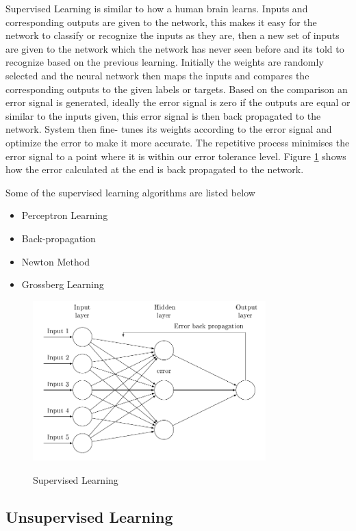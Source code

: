 \documentclass[12pt, a4paper]{report}
\begin{document}
Supervised Learning is similar to how a human brain learns. Inputs and corresponding outputs are given to the network, this makes it easy for the network to classify or recognize the inputs as they are, then a new set of inputs are given to the network which the network has never seen before and its told to recognize based on the previous learning. Initially the weights are randomly selected and the neural network then maps the inputs and compares the corresponding outputs to the given labels or targets. Based on the comparison an error signal is generated, ideally the error signal is zero if the outputs are equal or similar to the inputs given, this error signal is then back propagated to the network. System then fine- tunes its weights according to the error signal and optimize the error to make it more accurate. The repetitive process minimises the error signal to a point where it is within our error tolerance level. Figure \ref{fig:supervised} shows how the error calculated at the end is back propagated to the network.\\ \par
\clearpage
Some of the supervised learning algorithms are listed below
\begin{itemize}
	\item{Perceptron Learning}
	\item{Back-propagation}
	\item{Newton Method}
	\item{Grossberg Learning}
\end{itemize}

\begin{figure}[h]
\centering	
\includegraphics[width=9cm]{supervised.png}\\
\caption{Supervised Learning}
\label{fig:supervised}
\end{figure} 


\subsection{Unsupervised Learning}\label{sec:unsupervised}
\end{document}
